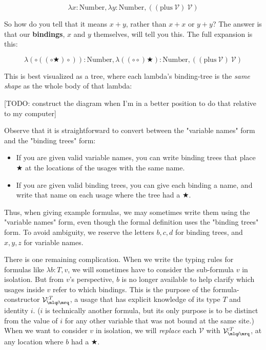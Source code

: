 \documentclass{article}
\newcommand{\usage}{\mathcal{V}}
\newcommand{\usageKnown}[2]{{\usage_{\mlq\hspace{-0.06em}#2\hspace{-0.06em}\mrq}^{:#1}}}
\newcommand{\bindvariable}{\bigstar}
\newcommand{\bindnotthis}{\circ}
\begin{document}
  \[ \lambda x : \mathrm{Number}, \lambda y : \mathrm{Number}, ((\mathrm{plus}\ \usage)\ \usage) \]
  
  So how do you tell that it means $x + y$, rather than $x + x$ or $y + y$? The answer is that our \textbf{bindings}, $x$ and $y$ themselves, will tell you this. The full expansion is this:
  
  \[ \lambda (\bindnotthis((\bindnotthis \bindvariable) \bindnotthis)) : \mathrm{Number}, \lambda ((\bindnotthis \bindnotthis) \bindvariable) : \mathrm{Number}, ((\mathrm{plus}\ \usage)\ \usage) \]
  
  This is best visualized as a tree, where each lambda's binding-tree is the \emph{same shape} as the whole body of that lambda:
  
  [TODO: construct the diagram when I'm in a better position to do that relative to my computer]
  
  Observe that it is straightforward to convert between the "variable names" form and the "binding trees" form:
  \begin{itemize}
    \item If you are given valid variable names, you can write binding trees that place $\bindvariable$ at the locations of the usages with the same name.
    \item If you are given valid binding trees, you can give each binding a name, and write that name on each usage where the tree had a $\bindvariable$.
  \end{itemize}
  
  Thus, when giving example formulas, we may sometimes write them using the "variable names" form, even though the formal definition uses the "binding trees" form. To avoid ambiguity, we reserve the letters $b,c,d$ for binding trees, and $x,y,z$ for variable names.
  
  There is one remaining complication. When we write the typing rules for formulas like $\lambda b:T,v$, we will sometimes have to consider the sub-formula $v$ in isolation. But from $v$'s perspective, $b$ is no longer available to help clarify which usages inside $v$ refer to which bindings. This is the purpose of the formula-constructor $\usageKnown{T}{i}$, a usage that has explicit knowledge of its type $T$ and identity $i$. ($i$ is technically another formula, but its only purpose is to be distinct from the value of $i$ for any other variable that was not bound at the same site.) When we want to consider $v$ in isolation, we will \emph{replace} each $\usage$ with $\usageKnown{T}{i}$, at any location where $b$ had a $\bindvariable$.\\
  
\end{document}
